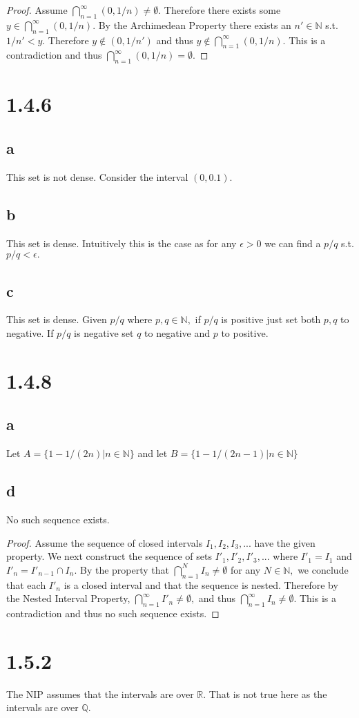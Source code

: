 \documentclass[10pt]{article}
\begin{document}
\begin{proof}
    Assume $\bigcap_{n=1}^\infty (0,1/n)\neq \emptyset.$ Therefore there exists some $y \in \bigcap_{n=1}^\infty (0,1/n).$ By the Archimedean Property there exists an $n'\in\mathbb{N}$ s.t. $1/n'<y.$ Therefore $y\notin (0, 1/n')$ and thus $y \notin \bigcap_{n=1}^\infty (0,1/n).$ This is a contradiction and thus $\bigcap_{n=1}^\infty (0,1/n) = \emptyset.$ 
\end{proof}

\section*{1.4.6}

\subsection*{a}
This set is not dense. Consider the interval $(0, 0.1).$

\subsection*{b}
This set is dense. Intuitively this is the case as for any $\epsilon > 0$ we can find a $p/q$ s.t. $p/q < \epsilon.$

\subsection*{c}
This set is dense. Given $p/q$ where $p,q\in\mathbb{N},$ if $p/q$ is positive just set both $p,q$ to negative. If $p/q$ is negative set $q$ to negative and $p$ to positive.

\section*{1.4.8}

\subsection*{a}
Let $A=\{1-1/(2n)|n\in\mathbb{N}\}$ and let $B=\{1-1/(2n-1)|n\in\mathbb{N}\}$

\subsection*{d}
No such sequence exists.
\begin{proof}
    Assume the sequence of closed intervals $I_1, I_2,I_3,...$ have the given property. We next construct the sequence of sets $I'_1, I'_2, I'_3,...$ where $I'_1 = I_1$ and $I'_n = I'_{n-1}\cap I_n.$ By the property that $\bigcap_{n=1}^N I_n \neq\emptyset$ for any $N\in\mathbb{N},$ we conclude that each $I'_n$ is a closed interval and that the sequence is nested. Therefore by the Nested Interval Property, $\bigcap_{n=1}^\infty I'_n \neq\emptyset,$ and thus $\bigcap_{n=1}^\infty I_n \neq\emptyset.$ This is a contradiction and thus no such sequence exists.
\end{proof}

\section*{1.5.2} 
The NIP assumes that the intervals are over $\mathbb{R}.$ That is not true here as the intervals are over $\mathbb{Q}.$
\end{document}
